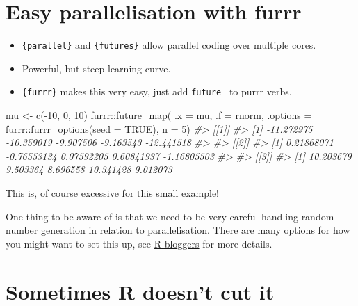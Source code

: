 \documentclass[
  12pt,
]{book}
\newenvironment{Shaded}{\begin{snugshade}}{\end{snugshade}}
\newcommand{\AttributeTok}[1]{\textcolor[rgb]{0.77,0.63,0.00}{#1}}
\newcommand{\CommentTok}[1]{\textcolor[rgb]{0.56,0.35,0.01}{\textit{#1}}}
\newcommand{\ConstantTok}[1]{\textcolor[rgb]{0.00,0.00,0.00}{#1}}
\newcommand{\DecValTok}[1]{\textcolor[rgb]{0.00,0.00,0.81}{#1}}
\newcommand{\FunctionTok}[1]{\textcolor[rgb]{0.00,0.00,0.00}{#1}}
\newcommand{\NormalTok}[1]{#1}
\newcommand{\OtherTok}[1]{\textcolor[rgb]{0.56,0.35,0.01}{#1}}
\newcommand{\SpecialCharTok}[1]{\textcolor[rgb]{0.00,0.00,0.00}{#1}}
\begin{document}
\hypertarget{easy-parallelisation-with-furrr}{%
\section{Easy parallelisation with furrr}\label{easy-parallelisation-with-furrr}}

\begin{itemize}
\item
  \texttt{\{parallel\}} and \texttt{\{futures\}} allow parallel coding over multiple cores.
\item
  Powerful, but steep learning curve.
\item
  \texttt{\{furrr\}} makes this very easy, just add \texttt{future\_} to purrr verbs.
\end{itemize}

\begin{Shaded}
\begin{Highlighting}[]
\NormalTok{mu }\OtherTok{\textless{}{-}} \FunctionTok{c}\NormalTok{(}\SpecialCharTok{{-}}\DecValTok{10}\NormalTok{, }\DecValTok{0}\NormalTok{, }\DecValTok{10}\NormalTok{)}
\NormalTok{furrr}\SpecialCharTok{::}\FunctionTok{future\_map}\NormalTok{(}
  \AttributeTok{.x =}\NormalTok{ mu, }
  \AttributeTok{.f =}\NormalTok{ rnorm,}
  \AttributeTok{.options =}\NormalTok{ furrr}\SpecialCharTok{::}\FunctionTok{furrr\_options}\NormalTok{(}\AttributeTok{seed =} \ConstantTok{TRUE}\NormalTok{),}
  \AttributeTok{n =} \DecValTok{5}\NormalTok{) }
\CommentTok{\#\textgreater{} [[1]]}
\CommentTok{\#\textgreater{} [1] {-}11.272975 {-}10.359019  {-}9.907506  {-}9.163543 {-}12.441518}
\CommentTok{\#\textgreater{} }
\CommentTok{\#\textgreater{} [[2]]}
\CommentTok{\#\textgreater{} [1]  0.21868071 {-}0.76553134  0.07592205  0.60841937 {-}1.16805503}
\CommentTok{\#\textgreater{} }
\CommentTok{\#\textgreater{} [[3]]}
\CommentTok{\#\textgreater{} [1] 10.203679  9.503364  8.696558 10.341428  9.012073}
\end{Highlighting}
\end{Shaded}

This is, of course excessive for this small example!

One thing to be aware of is that we need to be very careful handling random number generation in relation to parallelisation. There are many options for how you might want to set this up, see \href{https://www.r-bloggers.com/2020/09/future-1-19-1-making-sure-proper-random-numbers-are-produced-in-parallel-processing/}{R-bloggers} for more details.

\hypertarget{sometimes-r-doesnt-cut-it}{%
\section{Sometimes R doesn't cut it}\label{sometimes-r-doesnt-cut-it}}
\end{document}
